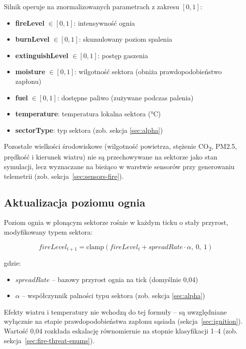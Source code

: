 \documentclass[11pt,a4paper]{article}
\begin{document}
Silnik operuje na znormalizowanych parametrach z zakresu $[0,1]$:
\begin{itemize}
    \item \textbf{fireLevel} $\in [0,1]$: intensywność ognia
    \item \textbf{burnLevel} $\in [0,1]$: skumulowany poziom spalenia
    \item \textbf{extinguishLevel} $\in [0,1]$: postęp gaszenia
    \item \textbf{moisture} $\in [0,1]$: wilgotność sektora (obniża prawdopodobieństwo zapłonu)
    \item \textbf{fuel} $\in [0,1]$: dostępne paliwo (zużywane podczas palenia)
    \item \textbf{temperature}: temperatura lokalna sektora (°C)
    \item \textbf{sectorType}: typ sektora (zob. sekcja \ref{sec:alpha})
\end{itemize}

Pozostałe wielkości środowiskowe (wilgotność powietrza, stężenie CO\textsubscript{2}, PM2.5, prędkość i kierunek wiatru) nie są przechowywane na sektorze jako stan symulacji, lecz wyznaczane na bieżąco w warstwie sensorów przy generowaniu telemetrii (zob. sekcja~\ref{sec:sensors-fire}).

\subsection{Aktualizacja poziomu ognia}

Poziom ognia w płonącym sektorze rośnie w każdym ticku o stały przyrost, modyfikowany typem sektora:

\begin{equation}
fireLevel_{t+1} = \mathrm{clamp}\!\left(fireLevel_t + spreadRate \cdot \alpha,\ 0,\ 1\right)
\end{equation}

gdzie:
\begin{itemize}
    \item $spreadRate$ -- bazowy przyrost ognia na tick (domyślnie 0,04)
    \item $\alpha$ -- współczynnik palności typu sektora (zob. sekcja \ref{sec:alpha})
\end{itemize}

Efekty wiatru i temperatury nie wchodzą do tej formuły -- są uwzględniane wyłącznie na etapie prawdopodobieństwa zapłonu sąsiada (sekcja~\ref{sec:ignition}). Wartość 0,04 rozkłada eskalację równomiernie na stopnie klasyfikacji 1--4 (zob. sekcja~\ref{sec:fire-threat-enums}).
\end{document}
